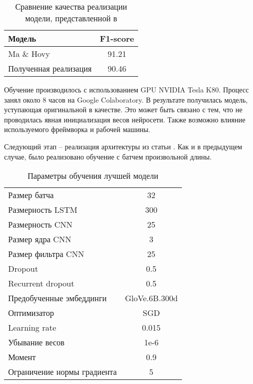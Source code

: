 \documentclass[a4paper,14pt]{extarticle}
\begin{document}
\begin{table}[H]
    \caption{Сравнение качества реализации модели, представленной в \cite{1603.01354}}
    \label{progress}
    \begin{center}
    \begin{tabular}{l|c}
        Модель                 & F1-score \\
        \hline
        Ma \& Hovy             & 91.21    \\
        Полученная реализация  & 90.46    \\
    \end{tabular}
    \end{center}
\end{table}

Обучение производилось с использованием GPU NVIDIA Tesla K80. Процесс занял около 8 часов на Google Colaboratory. В результате получилась модель, уступающая оригинальной в качестве. Это может быть связано с тем, что не проводилась явная инициализация весов нейросети. Также возможно влияние используемого фреймворка и рабочей машины.

Следующий этап -- реализация архитектуры из статьи \cite{1808.09075}. Как и в предыдущем случае, было реализовано обучение с батчем произвольной длины.

\begin{table}[H]
    \caption{Параметры обучения лучшей модели}
    \label{progress}
    \begin{center}
    \begin{tabular}{l|c}
        Размер батча & 32 \\
        Размерность LSTM & 300 \\
        Размерность CNN & 25 \\
        Размер ядра CNN & 3 \\
        Размер фильтра CNN & 25 \\
        Dropout & 0.5 \\
        Recurrent dropout & 0.5 \\
        Предобученные эмбеддинги & GloVe.6B.300d \\
        Оптимизатор & SGD \\
        Learning rate & 0.015 \\
        Убывание весов & 1e-6 \\
        Момент & 0.9 \\
        Ограничение нормы градиента & 5 \\
    \end{tabular}
    \end{center}
\end{table}
\end{document}

